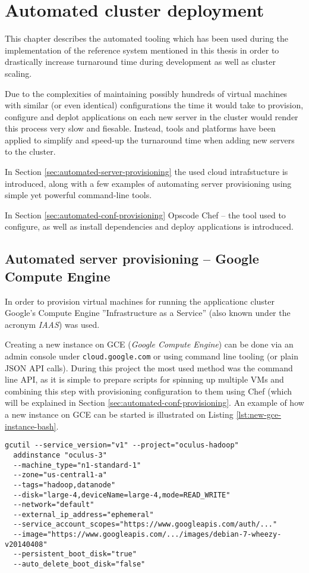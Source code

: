 \chapter{Automated cluster deployment}
This chapter describes the automated tooling which has been used during the implementation of the reference system mentioned in this thesis in order to drastically increase turnaround time during development as well as cluster scaling.

Due to the complexities of maintaining possibly hundreds of virtual machines with similar (or even identical) configurations the time it would take to provision, configure and deplot applications on each new server in the cluster would render this process very slow and fiesable. Instead, tools and platforms have been applied to simplify and speed-up the turnaround time when adding new servers to the cluster. 

In Section \ref{sec:automated-server-provisioning} the used cloud intrafstucture is introduced, along with a few examples of automating server provisioning using simple yet powerful command-line tools. 

In Section \ref{sec:automated-conf-provisioning} Opscode Chef -- the tool used to configure, as well as install dependencies and deploy applications is introduced.

\label{sec:automated-server-provisioning}
\section{Automated server provisioning -- Google Compute Engine}

In order to provision virtual machines for running the applicationc cluster Google's Compute Engine ''Infrastructure as a Service'' (also known under the acronym \textit{IAAS}) was used. 

Creating a new instance on GCE (\textit{Google Compute Engine}) can be done via an admin console under \verb|cloud.google.com| or using command line tooling (or plain JSON API calls). During this project the most used method was the command line API, as it is simple to prepare scripts for spinning up multiple VMs and combining this step with provisioning configuration to them using Chef (which will be explained in Section \ref{sec:automated-conf-provisioning}. An example of how a new instance on GCE can be started is illustrated on Listing \ref{lst:new-gce-instance-bash}.

\begin{lstlisting}[caption={Creating new instance on GCE}, label={lst:new-gce-instance-bash}]
gcutil --service_version="v1" --project="oculus-hadoop" 
  addinstance "oculus-3" 
  --machine_type="n1-standard-1" 
  --zone="us-central1-a" 
  --tags="hadoop,datanode"
  --disk="large-4,deviceName=large-4,mode=READ_WRITE"
  --network="default" 
  --external_ip_address="ephemeral" 
  --service_account_scopes="https://www.googleapis.com/auth/..." 
  --image="https://www.googleapis.com/.../images/debian-7-wheezy-v20140408" 
  --persistent_boot_disk="true" 
  --auto_delete_boot_disk="false"
\end{lstlisting}



